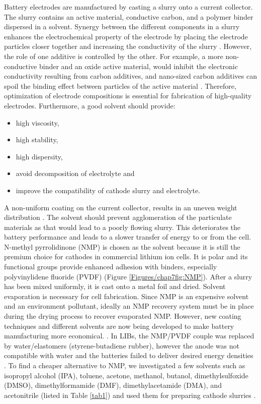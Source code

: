 Battery electrodes are manufactured by casting a slurry onto a current collector. The slurry contains an active material, conductive carbon, and a polymer binder dispersed in a solvent. Synergy between the different components in a slurry enhances the electrochemical property of the electrode by placing the electrode particles closer together and increasing the conductivity of the slurry \cite{zheng_cooperation_2012}.
However, the role of one additive is controlled by the other. For example, a more non-conductive binder and an oxide active material, would inhibit the electronic conductivity resulting from carbon additives, and nano-sized carbon additives can spoil the binding effect between particles of the active material \cite{guy_novel_2006, seki_effect_2004}. Therefore, optimization of electrode compositions is essential for fabrication of high-quality electrodes. Furthermore, a good solvent should provide:
\begin{itemize}
    \item high viscosity,
    \item high stability,
    \item high dispersity,
    \item avoid decomposition of electrolyte and 
    \item improve the compatibility of cathode slurry and electrolyte.
\end{itemize}
A non-uniform coating on the current collector, results in an uneven weight distribution \cite{ludwig_solvent-free_2016}. The solvent should prevent agglomeration of the particulate materials as that would lead to a poorly flowing slurry. This deteriorates the battery performance and leads to a slower transfer of energy to or from the cell. N-methyl pyrrolidinone (NMP) is chosen as the solvent because it is still the premium choice for cathodes in commercial lithium ion cells. It is polar and its functional groups provide enhanced adhesion with binders, especially polyvinylidene fluoride (PVDF) (Figure \ref{Figures/chap7fig:NMP}). After a slurry has been mixed uniformly, it is cast onto a metal foil and dried. Solvent evaporation is necessary for cell fabrication. Since NMP is an expensive solvent and an environment pollutant, ideally an NMP recovery system must be in place during the drying process to recover evaporated NMP. However, new coating techniques and different solvents are now being developed to make battery manufacturing more economical. \cite{liu_effective_2014-1,spreafico_pvdf_2014-1, liu_effects_2008-1, lee_effect_2010-1, wenzel_challenges_2015, lee_selection_2017, stein_non-aqueous_2016}. In LIBs, the NMP/PVDF couple was replaced by water/elastomers (styrene-butadiene rubber), however the anode was not compatible with water and the batteries failed to deliver desired energy densities \cite{lee_novel_2007, li_effects_2005}. 
To find a cheaper alternative to NMP, we investigated a few solvents such as isopropyl alcohol (IPA), toluene, acetone, methanol, butanol, dimethylsulfoxide (DMSO), dimethylformamide (DMF), dimethylacetamide (DMA), and acetonitrile (listed in Table \ref{tab1}) and used them for preparing cathode slurries . 

